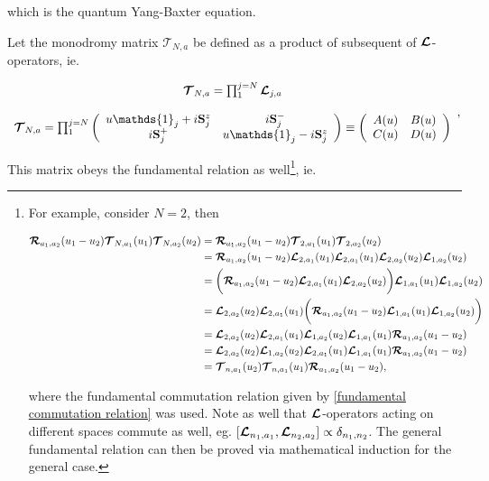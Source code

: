 \documentclass{homework}
\begin{document}
which is the quantum Yang-Baxter equation. \\

\begin{df}
    Let the monodromy matrix $\bm{\mathcal{T}}_{N,a}$ be defined as a product of subsequent of $\bm{\mathcal{L}}$-operators, ie.

\begin{equation}
    \begin{array}{c}
         \bmt_{N,a} = \prod^{j=N}_{1} \bl_{j,a} \\
         \\
         \bmt_{N,a} = \prod^{j=N}_{1} \left(\begin{array}{cc}
            u \mathds{1}_j + i \spin_j^z & i \spin_j^-  \\
            i \spin_j^+ & u \mathds{1}_j - i \spin_j^z
         \end{array}\right) \equiv \left(\begin{array}{cc}
            A(u) & B(u) \\
            C(u) & D(u)
         \end{array}\right) 
    \end{array},
\end{equation}
\end{df}

This matrix obeys the fundamental relation as well\footnote{ For example, consider $N=2$, then

\begin{equation}
    \begin{split}
        {\bm {\mathcal{R}}_{a_1, a_2}(u_1-u_2) \bm{\mathcal{T}}_{N, a_1} (u_1) \bm{\mathcal{T}}_{N, a_2} (u_2)} &= {\bm {\mathcal{R}}_{a_1, a_2}(u_1-u_2) \bm{\mathcal{T}}_{2, a_1} (u_1) \bm{\mathcal{T}}_{2, a_2} (u_2)} \\
        &= {\bm {\mathcal{R}}_{a_1, a_2}(u_1-u_2) \bm{\mathcal{L}}_{2, a_1} (u_1) \bm{\mathcal{L}}_{2, a_1} (u_1) \bm{\mathcal{L}}_{2, a_2} (u_2) \bm{\mathcal{L}}_{1, a_2} (u_2)} \\
        &= \bigg(\bm {\mathcal{R}}_{a_1, a_2}(u_1-u_2) \bm{\mathcal{L}}_{2, a_1} (u_1) \bm{\mathcal{L}}_{2, a_2} (u_2)\bigg) \bm{\mathcal{L}}_{1, a_1} (u_1) \bm{\mathcal{L}}_{1, a_2} (u_2) \\
        &=  \bm{\mathcal{L}}_{2, a_2} (u_2) \bm{\mathcal{L}}_{2, a_1} (u_1) \bigg(\bm {\mathcal{R}}_{a_1, a_2}(u_1-u_2)\bm{\mathcal{L}}_{1, a_1} (u_1) \bm{\mathcal{L}}_{1, a_2} (u_2) \bigg) \\
        &= \bm{\mathcal{L}}_{2, a_2} (u_2) \bm{\mathcal{L}}_{2, a_1} (u_1) \bm{\mathcal{L}}_{1, a_2} (u_2) \bm{\mathcal{L}}_{1, a_1} (u_1) \bm {\mathcal{R}}_{a_1, a_2}(u_1-u_2) \\
        &=  \bm{\mathcal{L}}_{2, a_2} (u_2) \bm{\mathcal{L}}_{1, a_2} (u_2) \bm{\mathcal{L}}_{2, a_1} (u_1) \bm{\mathcal{L}}_{1, a_1} (u_1) \bm {\mathcal{R}}_{a_1, a_2}(u_1-u_2) \\
        &= \bm{\mathcal{T}}_{n, a_1} (u_2) \bm{\mathcal{T}}_{n, a_1} (u_1) \bm{\mathcal{R}}_{a_1, a_2}(u_1-u_2),
    \end{split}
\end{equation}

where the fundamental commutation relation given by \eqref{fundamental commutation relation} was used. Note as well that $\bm{\mathcal{L}}$-operators acting on different spaces commute as well, eg. $[\bm{\mathcal{L}}_{n_1, a_1}, \bm{\mathcal{L}}_{n_2, a_2}] \propto \delta_{n_1, n_2}$. The general fundamental relation can then be proved via mathematical induction for the general case.}, ie.
\end{document}
